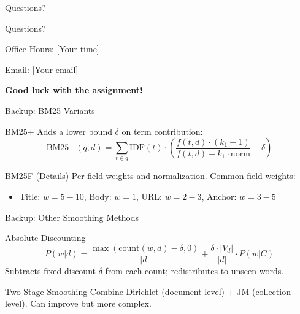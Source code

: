 \documentclass[aspectratio=169]{beamer}
\begin{document}
\begin{frame}{Questions?}
\begin{center}
\Huge Questions?

\vspace{2em}

\Large
Office Hours: [Your time]

\vspace{1em}

Email: [Your email]

\vspace{2em}

\normalsize
\textbf{Good luck with the assignment!}
\end{center}
\end{frame}

\appendix

\begin{frame}{Backup: BM25 Variants}
\begin{block}{BM25+}
Adds a lower bound $\delta$ on term contribution:
$$\text{BM25+}(q,d) = \sum_{t \in q} \text{IDF}(t) \cdot \left(\frac{f(t,d) \cdot (k_1+1)}{f(t,d) + k_1 \cdot \text{norm}} + \delta\right)$$
\end{block}

\begin{block}{BM25F (Details)}
Per-field weights and normalization. Common field weights:
\begin{itemize}
    \item Title: $w = 5{-}10$, Body: $w = 1$, URL: $w = 2{-}3$, Anchor: $w = 3{-}5$
\end{itemize}
\end{block}
\end{frame}

\begin{frame}{Backup: Other Smoothing Methods}
\begin{block}{Absolute Discounting}
$$P(w|d) = \frac{\max(\text{count}(w,d) - \delta, 0)}{|d|} + \frac{\delta \cdot |V_d|}{|d|} \cdot P(w|C)$$
Subtracts fixed discount $\delta$ from each count; redistributes to unseen words.
\end{block}

\begin{block}{Two-Stage Smoothing}
Combine Dirichlet (document-level) + JM (collection-level). Can improve but more complex.
\end{block}
\end{frame}
\end{document}
